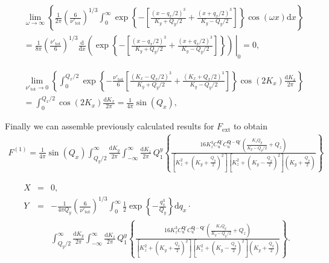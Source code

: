 \documentclass[prb,singlecolumn]{revtex4}
\begin{document}
\begin{eqnarray}
&& \lim_{\omega \rightarrow \infty} \left\{ \frac1{2\pi}\left(\frac{6}{\nu'_\mathrm{tot}}\right)^{1/3}\int_{0}^\infty \exp\left\{-\left[\frac{(x-q_x/2)^3}{K_y+Q_y/2}+\frac{(x+q_x/2)^3}{K_y-Q_y/2}\right]\right\} \cos(\omega x) \mathrm{d}x  \right\} \nonumber \\
&& {}= \frac1{8\pi} \left(\frac{\nu'_\mathrm{tot}}{6}\right)^{1/3} \left. \frac{\mathrm{d}}{\mathrm{d}x}  \left(\exp\left\{-\left[\frac{(x-q_x/2)^3}{K_y+Q_y/2}+\frac{(x+q_x/2)^3}{K_y-Q_y/2}\right]\right\}\right) \, \right|_0 = 0,
\end{eqnarray}

\begin{eqnarray}
&&\lim_{\nu'_{\mathrm{tot}} \rightarrow 0} \left\{ \int_0^{Q_x/2} \exp\left\{ -\frac{\nu'_{\mathrm{tot}}}{6}\left[\frac{(K_x-Q_x/2)^3}{K_y+Q_y/2}+\frac{(K_x+Q_x/2)^3}{K_y-Q_y/2}\right]\right\} \cos(2K_x) \frac{\mathrm{d}K_x}{2\pi} \right\} \nonumber\\
&& {}= \int_0^{Q_x/2} \cos(2K_x) \frac{\mathrm{d}K_x}{2\pi} = \frac1{4\pi}\sin(Q_x),
\end{eqnarray}



Finally we can assemble previously calculated results for $F_\mathrm{ext}$ to obtain
\begin{eqnarray*}
 F^{(1)} =  \frac1{4\pi}\sin(Q_x) \int_{Q_y/2}^\infty \frac{\mathrm{d}K_y}{2\pi} \int_{-\infty}^\infty \frac{\mathrm{d}K_z}{2\pi} \, Q_1^y 
  \left\{ \frac{16K_z^3 C_\mathrm{u}^{\mathbf{Q}'}C_\mathrm{u}^{\mathbf{Q-Q}'}  \left( \frac{K_z Q_y}{K_y - Q_y/2} + Q_z\right) }
  { \left[K_z^2 + \left(K_y+\frac{Q_y}2 \right)^2\right] \left[K_z^2 + \left(K_y - \frac{Q_y}2 \right)^2\right]\left(K_y +\frac{Q_y}2 \right) }  \right\}
\end{eqnarray*}


\begin{eqnarray*}
 X &=& 0,\nonumber \\
 Y &=& -\frac1{4\pi Q_y}\left(\frac6{\nu'_\mathrm{tot}}\right)^{1/3} \int_0^\infty \frac12 \exp\left\{-\frac{q_x^3}{Q_y} \right\} \mathrm{d}q_x \cdot \nonumber \\
 &&\int_{Q_y/2}^\infty \frac{\mathrm{d}K_y}{2\pi} \int_{-\infty}^\infty \frac{\mathrm{d}K_z}{2\pi} \, Q_1^y 
  \left\{ \frac{16K_z^3 C_\mathrm{u}^{\mathbf{Q}'}C_\mathrm{u}^{\mathbf{Q-Q}'}  \left( \frac{K_z Q_y}{K_y - Q_y/2} + Q_z\right) }
  { \left[K_z^2 + \left(K_y+\frac{Q_y}2 \right)^2\right] \left[K_z^2 + \left(K_y - \frac{Q_y}2 \right)^2\right]\left(K_y +\frac{Q_y}2 \right) }  \right\} .\nonumber
\end{eqnarray*}
\end{document}
